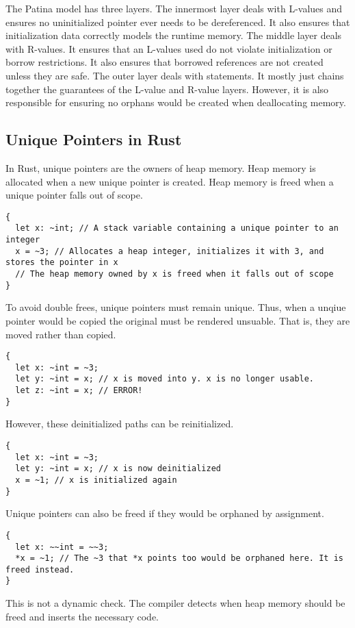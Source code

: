 The Patina model has three layers.
The innermost layer deals with L-values and ensures no uninitialized pointer
ever needs to be dereferenced. It also ensures that initialization data correctly
models the runtime memory.
The middle layer deals with R-values.
It ensures that an L-values used do not violate initialization or borrow restrictions.
It also ensures that borrowed references are not created unless they are safe.
The outer layer deals with statements.
It mostly just chains together the guarantees of the L-value and R-value layers.
However, it is also responsible for ensuring no orphans would be created when deallocating memory.

\subsection*{Unique Pointers in Rust}
In Rust, unique pointers are the owners of heap memory.
Heap memory is allocated when a new unique pointer is created.
Heap memory is freed when a unique pointer falls out of scope.
\begin{verbatim}
{
  let x: ~int; // A stack variable containing a unique pointer to an integer
  x = ~3; // Allocates a heap integer, initializes it with 3, and stores the pointer in x
  // The heap memory owned by x is freed when it falls out of scope
}
\end{verbatim}

To avoid double frees, unique pointers must remain unique.
Thus, when a unqiue pointer would be copied the original must be rendered unsuable.
That is, they are moved rather than copied.
\begin{verbatim}
{
  let x: ~int = ~3;
  let y: ~int = x; // x is moved into y. x is no longer usable.
  let z: ~int = x; // ERROR!
}
\end{verbatim}

However, these deinitialized paths can be reinitialized.
\begin{verbatim}
{
  let x: ~int = ~3;
  let y: ~int = x; // x is now deinitialized
  x = ~1; // x is initialized again
}
\end{verbatim}

Unique pointers can also be freed if they would be orphaned by assignment.
\begin{verbatim}
{
  let x: ~~int = ~~3;
  *x = ~1; // The ~3 that *x points too would be orphaned here. It is freed instead.
}
\end{verbatim}

This is not a dynamic check. 
The compiler detects when heap memory should be freed and inserts the necessary code.

